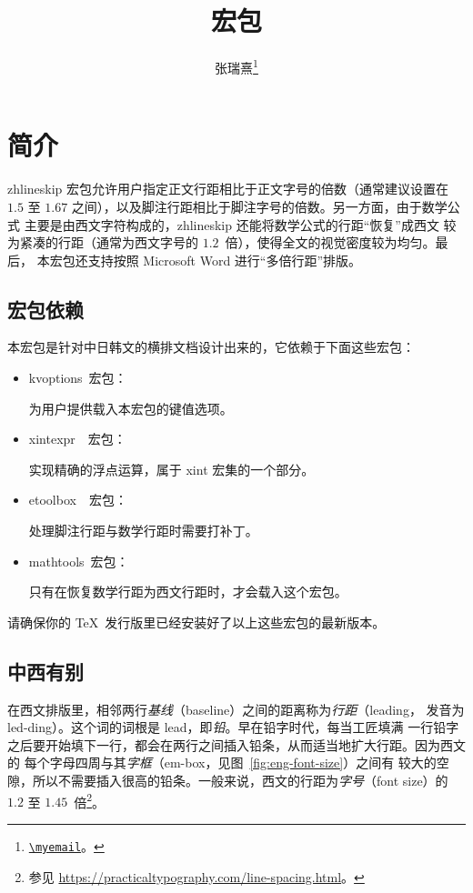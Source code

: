 \documentclass[zihao=5,no-math,a4paper]{ctexart}
\title{\vspace*{-26bp}\pkg{zhlineskip} 宏包}
\author{张瑞熹\thanks{\href{mailto:\myemail}{\nolinkurl{\myemail}}。}}
\date{2018/11/30\hskip\ccwd\relax v1.0d}
\newcommand\pkg[1]{{\normalfont\ttfamily#1}}
\newcommand*\packagedependency[1]{%
  \mbox{\pkg{#1}~宏包：}\ignorespaces
}
\begin{document}
\maketitle

\tableofcontents

\section{简介}

\pkg{zhlineskip} 宏包允许用户指定正文行距相比于正文字号的倍数（通常建议设置在
$1.5$ 至 $1.67$ 之间），以及脚注行距相比于脚注字号的倍数。另一方面，由于数学公式
主要是由西文字符构成的，\pkg{zhlineskip} 还能将数学公式的行距“恢复”成西文
较为紧凑的行距（通常为西文字号的 $1.2$~倍），使得全文的视觉密度较为均匀。最后，
本宏包还支持按照 Microsoft Word 进行“多倍行距”排版。

\subsection{宏包依赖}

本宏包是针对中日韩文的横排文档设计出来的，它依赖于下面这些宏包：
\begin{itemize}
\item \packagedependency{kvoptions}
为用户提供载入本宏包的键值选项。
\item \packagedependency{xintexpr~}
实现精确的浮点运算，属于 \pkg{xint} 宏集的一个部分。
\item \packagedependency{etoolbox~}
处理脚注行距与数学行距时需要打补丁。
\item \packagedependency{mathtools}
只有在恢复数学行距为西文行距时，才会载入这个宏包。
\end{itemize}
请确保你的 \TeX\ 发行版里已经安装好了以上这些宏包的最新版本。

\subsection{中西有别}

在西文排版里，相邻两行\emph{基线}（baseline）之间的距离称为\emph{行距}（leading，
发音为 led-ding）。这个词的词根是 lead，即\emph{铅}。早在铅字时代，每当工匠填满
一行铅字之后要开始填下一行，都会在两行之间插入铅条，从而适当地扩大行距。因为西文的
每个字母四周与其\emph{字框}（em-box，见图~\ref{fig:eng-font-size}）之间有
较大的空隙，所以不需要插入很高的铅条。一般来说，西文的行距为\emph{字号}（font
size）的 $1.2$ 至 $1.45$~倍\footnote{参见
\url{https://practicaltypography.com/line-spacing.html}。}。
\end{document}
